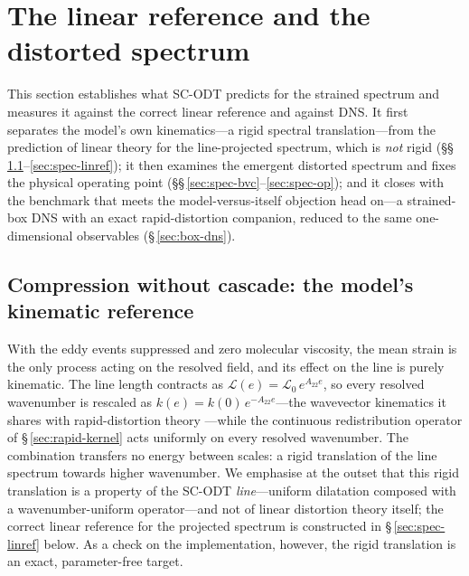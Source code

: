 \documentclass[11pt,a4paper]{article}
\begin{document}
\section{The linear reference and the distorted spectrum}\label{sec:val-spectrum}

This section establishes what SC-ODT predicts for the strained spectrum
and measures it against the correct linear reference and against DNS.
It first separates the model's own kinematics---a rigid spectral
translation---from the prediction of linear theory for the
line-projected spectrum, which is \emph{not} rigid
(\S\S\,\ref{sec:spec-rdt}--\ref{sec:spec-linref}); it then examines the
emergent distorted spectrum and fixes the physical operating point
(\S\S\,\ref{sec:spec-bvc}--\ref{sec:spec-op}); and it closes with the
benchmark that meets the model-versus-itself objection head on---a
strained-box DNS with an exact rapid-distortion companion, reduced to
the same one-dimensional observables (\S\,\ref{sec:box-dns}).

\subsection{Compression without cascade: the model's kinematic
reference}\label{sec:spec-rdt}

With the eddy events suppressed and zero molecular viscosity, the mean strain
is the only process acting on the resolved field, and its effect on the line
is purely kinematic. The line length contracts as
$\mathcal{L}(e)=\mathcal{L}_0\,e^{A_{22}e}$, so every resolved wavenumber is
rescaled as $k(e)=k(0)\,e^{-A_{22}e}$---the wavevector kinematics it shares
with rapid-distortion theory \citep{BatchelorProudman1954,HuntCarruthers1990}%
---while the continuous redistribution operator of
\S\,\ref{sec:rapid-kernel} acts uniformly on every resolved wavenumber. The
combination transfers no energy between scales: a rigid translation of the
line spectrum towards higher wavenumber. We emphasise at the outset that this
rigid translation is a property of the SC-ODT \emph{line}---uniform
dilatation composed with a wavenumber-uniform operator---and not of linear
distortion theory itself; the correct linear reference for the projected
spectrum is constructed in \S\,\ref{sec:spec-linref} below. As a check on the
implementation, however, the rigid translation is an exact, parameter-free
target.
\end{document}

